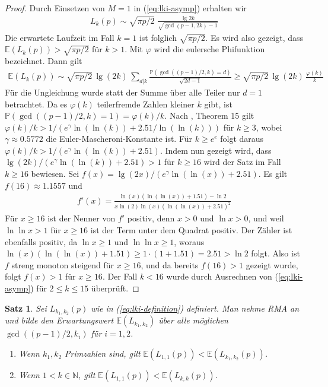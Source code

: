 \documentclass[a4paper, 11pt, ngerman]{article}
\newcommand{\E}{\mathbb{E}}
\newcommand{\N}{\mathbb{N}}
\renewcommand{\P}{\mathbb{P}}
\theoremstyle{definition}
\theoremstyle{plain}
\newtheorem{theorem}{Satz}
\theoremstyle{remark}
\begin{document}
\begin{proof}
    Durch Einsetzen von $M = 1$ in (\ref{eq:lki-asymp}) erhalten wir
    \begin{align*}
        L_k(p) \sim \sqrt {\pi p / 2} \;
        \frac {\lg 2k} {\sqrt{\gcd(p - 1, 2k) - 1}}
    \end{align*}
    Die erwartete Laufzeit im Fall $k = 1$ ist folglich $\sqrt{\pi p/2}$. Es wird also gezeigt, dass $\E(L_k(p)) > \sqrt{\pi p / 2}$ für $k > 1$. Mit $\varphi$ wird die eulersche Phifunktion bezeichnet. Dann gilt
    \begin{align*}
        \E(L_k(p))
        \sim \sqrt{\pi p / 2} \, \lg (2k) \,
        \sum_{d | k} \frac {\P(\gcd((p - 1)/2, k) = d)}
        { \sqrt {2d - 1}} \nonumber
        \ge \sqrt{\pi p / 2} \, \lg (2k) \, \frac {\varphi(k)} k
    \end{align*}
    Für die Ungleichung wurde statt der Summe über alle Teiler nur $d = 1$ betrachtet. Da es $\varphi(k)$ teilerfremde Zahlen kleiner $k$ gibt, ist $\P(\gcd((p - 1)/2, k) = 1) = \varphi(k)/k$. Nach \cite{rs62}, Theorem 15 gilt $ \varphi(k) / k > 1 / (e^\gamma \ln (\ln (k)) + 2.51 / \ln (\ln (k)))$ für $k \ge 3$, wobei $\gamma \approx 0.5772$ die Euler-Mascheroni-Konstante ist. Für $k \ge e^e$ folgt daraus $\varphi(k) / k > 1/(e^\gamma \ln(\ln(k)) + 2.51)$. Indem nun gezeigt wird, dass $\lg (2k) / (e^\gamma \ln (\ln (k)) + 2.51) > 1$ für $k \ge 16$ wird der Satz im Fall $k \ge 16$ bewiesen. Sei $f(x) = \lg (2x) / (e^\gamma \ln (\ln (x)) + 2.51)$. Es gilt $f(16) \approx 1.1557$ und
    \begin{align*}
        f'(x)
        = \frac {\ln (x)(\ln (\ln (x)) + 1.51) - \ln 2}
        {x \ln (2) \ln (x)(\ln(\ln(x)) + 2.51)^2}
    \end{align*}
    Für $x \ge 16$ ist der Nenner von $f'$ positiv, denn $x > 0$ und $\ln x > 0$, und weil $\ln \ln x > 1$ für $x \ge 16$ ist der Term unter dem Quadrat positiv. Der Zähler ist ebenfalls positiv, da $\ln x \ge 1$ und $\ln \ln x \ge 1$, woraus $\ln(x)(\ln(\ln(x)) + 1.51) \ge 1 \cdot (1 + 1.51) = 2.51 > \ln 2$ folgt. Also ist $f$ streng monoton steigend für $x \ge 16$, und da bereits $f(16) > 1$ gezeigt wurde, folgt $f(x) > 1$ für $x \ge 16$. Der Fall $k < 16$ wurde durch Ausrechnen von (\ref{eq:lki-asymp}) für $2 \le k \le 15$ überprüft.
\end{proof}

\begin{theorem}
    \label{theorem:optimal-k-m2}
    Sei $L_{k_1, k_2}(p)$ wie in (\ref{eq:lki-definition}) definiert. Man nehme RMA an und bilde den Erwartungswert $\E(L_{k_1, k_2})$ über alle möglichen $\gcd((p - 1)/2, k_i)$ für $i = 1, 2$.
    \begin{enumerate}
        \item Wenn $k_1, k_2$ Primzahlen sind, gilt $\E(L_{1, 1}(p)) < \E(L_{k_1, k_2}(p))$.
        \item Wenn $1 < k \in \N$, gilt $\E(L_{1, 1}(p)) < \E(L_{k, k}(p))$.
    \end{enumerate}
\end{theorem}
\end{document}
